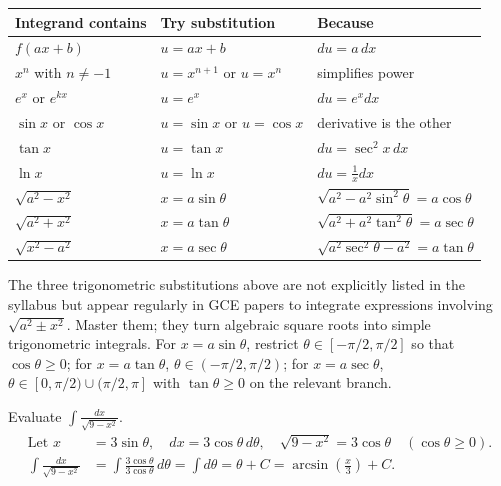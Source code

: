 \documentclass[11pt]{article}
\begin{document}
\begin{center}
\begin{tabularx}{\linewidth}{|l|X|X|}
\hline
\rowcolor{popblueL}
\textbf{Integrand contains} & \textbf{Try substitution} & \textbf{Because} \\
\hline
$f(ax+b)$ & $u = ax+b$ & $du = a\,dx$ \\
\hline
$x^n$ with $n\neq -1$ & $u = x^{n+1}$ or $u = x^n$ & simplifies power \\
\hline
$e^x$ or $e^{kx}$ & $u = e^x$ & $du = e^x dx$ \\
\hline
$\sin x$ or $\cos x$ & $u = \sin x$ or $u = \cos x$ & derivative is the other \\
\hline
$\tan x$ & $u = \tan x$ & $du = \sec^2 x\,dx$ \\
\hline
$\ln x$ & $u = \ln x$ & $du = \frac{1}{x}dx$ \\
\hline
$\sqrt{a^2-x^2}$ & $x = a\sin\theta$ & $\sqrt{a^2-a^2\sin^2\theta}=a\cos\theta$ \\
\hline
$\sqrt{a^2+x^2}$ & $x = a\tan\theta$ & $\sqrt{a^2+a^2\tan^2\theta}=a\sec\theta$ \\
\hline
$\sqrt{x^2-a^2}$ & $x = a\sec\theta$ & $\sqrt{a^2\sec^2\theta-a^2}=a\tan\theta$ \\
\hline
\end{tabularx}
\end{center}

\begin{aretenir}
The three trigonometric substitutions above are not explicitly listed in the syllabus but appear regularly in GCE papers to integrate expressions involving $\sqrt{a^2\pm x^2}$.  Master them; they turn algebraic square roots into simple trigonometric integrals.  For $x=a\sin\theta$, restrict $\theta\in[-\pi/2,\pi/2]$ so that $\cos\theta\ge0$; for $x=a\tan\theta$, $\theta\in(-\pi/2,\pi/2)$; for $x=a\sec\theta$, $\theta\in[0,\pi/2)\cup(\pi/2,\pi]$ with $\tan\theta\ge0$ on the relevant branch.
\end{aretenir}

\begin{exemplebox}
Evaluate $\displaystyle\int \frac{dx}{\sqrt{9-x^2}}$.
\begin{align*}
\text{Let } x &= 3\sin\theta,\quad dx = 3\cos\theta\,d\theta,\quad \sqrt{9-x^2} = 3\cos\theta \quad (\cos\theta\ge0). \\
\int \frac{dx}{\sqrt{9-x^2}} &= \int \frac{3\cos\theta}{3\cos\theta}\,d\theta = \int d\theta = \theta + C = \arcsin\!\left(\frac{x}{3}\right) + C.
\end{align*}
\end{exemplebox}
\end{document}
